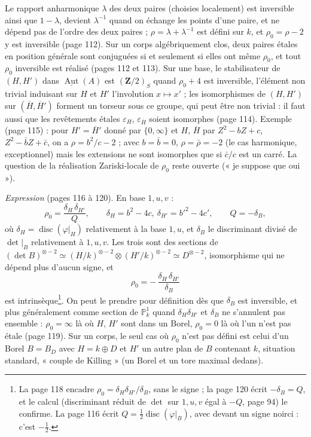 \documentclass[11pt,a4paper]{article}
\begin{document}
Le rapport anharmonique $\lambda$ des deux paires (choisies localement) est
inversible ainsi que $1 - \lambda$, devient $\lambda^{-1}$ quand on échange les
points d'une paire, et ne dépend pas de l'ordre des deux paires ; $\rho =
\lambda + \lambda^{-1}$ est défini sur $k$, et $\rho_0 = \rho - 2$ y est
inversible (page 112). Sur un corps algébriquement clos, deux paires étales en
position générale sont conjuguées si et seulement si elles ont même $\rho_0$, et
tout $\rho_0$ inversible est réalisé (pages 112 et 113). Sur une base, le
stabilisateur de $(H, H')$ dans $\underline{\operatorname{Aut}}(A)$ est
$(\mathbf{Z}/2)_S$ quand $\rho_0 + 4$ est inversible, l'élément non trivial
induisant sur $H$ et $H'$ l'involution $x \mapsto x'$ ; les isomorphismes de
$(H, H')$ sur $(\overline{H}, \overline{H}')$ forment un torseur sous ce groupe,
qui peut être non trivial : il faut aussi que les revêtements étales $\varepsilon_H$,
$\varepsilon_{\overline{H}}$ soient isomorphes (page 114). Exemple (page 115) :
pour $H' = \overline{H}'$ donné par $\{0, \infty\}$ et $H$, $\overline{H}$ par
$Z^2 - bZ + c$, $Z^2 - \bar bZ + \bar c$, on a $\rho = b^2/c - 2$ ; avec $b =
\bar b = 0$, $\rho = \bar\rho = -2$ (le cas harmonique, exceptionnel) mais les
extensions ne sont isomorphes que si $\bar c/c$ est un carré. La question de la
réalisation Zariski-locale de $\rho_0$ reste ouverte (« je suppose que oui »).

\emph{Expression} (pages 116 à 120). En base $1, u, v$ :
\[
  \rho_0 = \frac{\delta_H\,\delta_{H'}}{Q},\qquad \delta_H = b^2 - 4c,\
  \delta_{H'} = b'^2 - 4c',\qquad Q = -\delta_B ,
\]
où $\delta_H = \operatorname{disc}(\varphi|_H)$ relativement à la base $1, u$,
et $\delta_B$ le discriminant divisé de $\det|_B$ relativement à $1, u, v$. Les
trois sont des sections de $(\det B)^{\otimes -2} \simeq (H/k)^{\otimes -2}
\otimes (H'/k)^{\otimes -2} \simeq D^{\otimes -2}$, isomorphisme qui ne dépend
plus d'aucun signe, et
\[
  \rho_0 = -\,\frac{\delta_H\,\delta_{H'}}{\delta_B}
\]
est intrinsèque\footnote{La page 118 encadre $\rho_0 = \delta_H\delta_{H'}/\delta_B$,
sans le signe ; la page 120 écrit $-\delta_B = Q$, et le calcul (discriminant
réduit de $\det$ sur $1, u, v$ égal à $-Q$, page 94) le confirme. La page 116
écrit $Q = \frac12\operatorname{disc}(\varphi|_B)$, avec devant un signe
noirci : c'est $-\frac12$.}. On peut le prendre pour définition dès que $\delta_B$
est inversible, et plus généralement comme section de $\mathbb{P}^1_k$ quand
$\delta_H\delta_{H'}$ et $\delta_B$ ne s'annulent pas ensemble : $\rho_0 =
\infty$ là où $H$, $H'$ sont dans un Borel, $\rho_0 = 0$ là où l'un n'est pas
étale (page 119). Sur un corps, le seul cas où $\rho_0$ n'est pas défini est
celui d'un Borel $B = B_D$ avec $H = k \oplus D$ et $H'$ un autre plan de $B$
contenant $k$, situation standard, « couple de Killing » (un Borel et un tore
maximal dedans).
\end{document}
